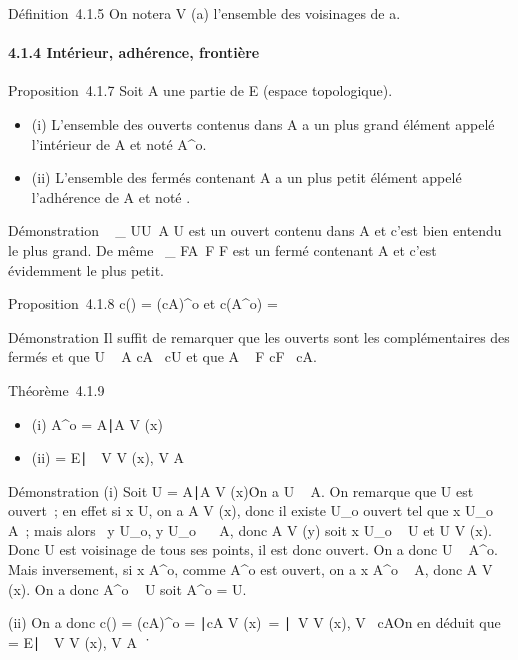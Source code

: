 \documentclass[]{article}
\begin{document}
Définition~4.1.5 On notera V (a) l'ensemble des voisinages de a.

\paragraph{4.1.4 Intérieur, adhérence, frontière}

Proposition~4.1.7 Soit A une partie de E (espace topologique).

\begin{itemize}
\itemsep1pt\parskip0pt
\item
  (i) L'ensemble des ouverts contenus dans A a un plus grand élément
  appelé l'intérieur de A et noté A^o.
\item
  (ii) L'ensemble des fermés contenant A a un plus petit élément appelé
  l'adhérence de A et noté \overlineA.
\end{itemize}

Démonstration \⋃ ~
\_ U\textouvert \atop U\subset~A U
est un ouvert contenu dans A et c'est bien entendu le plus grand. De
même \⋂  ~\_
F \atop A\subset~F F est un
fermé contenant A et c'est évidemment le plus petit.

Proposition~4.1.8 c(\overlineA) = (cA)^o
et c(A^o) = \overlinecA

Démonstration Il suffit de remarquer que les ouverts sont les
complémentaires des fermés et que U \subset~ A \Leftrightarrow cA
\subset~cU et que A \subset~ F \Leftrightarrow cF \subset~cA.

Théorème~4.1.9

\begin{itemize}
\itemsep1pt\parskip0pt
\item
  (i) A^o = \x \in
  A∣A \in V (x)\
\item
  (ii) \overlineA = \x \in
  E∣\forall~~V \in V (x), V \bigcap
  A\neq~\varnothing~\
\end{itemize}

Démonstration (i) Soit U = \x \in
A∣A \in V (x)\. On a U \subset~ A. On
remarque que U est ouvert~; en effet si x \in U, on a A \in V (x), donc il
existe U\_o ouvert tel que x \in U\_o \subset~ A~; mais alors
\forall~y \in U\_o, y \in U\_o~ \subset~ A, donc
A \in V (y) soit x \in U\_o \subset~ U et U \in V (x). Donc U est voisinage
de tous ses points, il est donc ouvert. On a donc U \subset~ A^o.
Mais inversement, si x \in A^o, comme A^o est
ouvert, on a x \in A^o \subset~ A, donc A \in V (x). On a donc
A^o \subset~ U soit A^o = U.

(ii) On a donc c(\overlineA) = (cA)^o =
\x∣cA \in V
(x)\ =
\x∣\exists~V
\in V (x), V \subset~cA\. On en déduit que
\overlineA = \x \in
E∣\forall~~V \in V (x), V \bigcap
A\neq~\varnothing~\.
\end{document}

